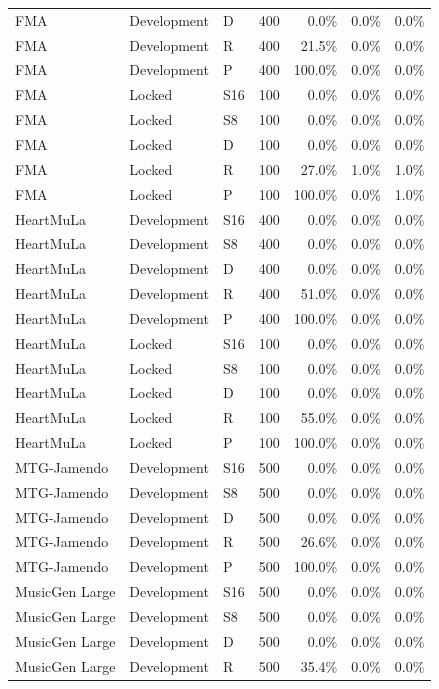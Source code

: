 \begin{longtable}{lllrrrr}
FMA & Development & D & 400 & 0.0\% & 0.0\% & 0.0\% \\
FMA & Development & R & 400 & 21.5\% & 0.0\% & 0.0\% \\
FMA & Development & P & 400 & 100.0\% & 0.0\% & 0.0\% \\
FMA & Locked & S16 & 100 & 0.0\% & 0.0\% & 0.0\% \\
FMA & Locked & S8 & 100 & 0.0\% & 0.0\% & 0.0\% \\
FMA & Locked & D & 100 & 0.0\% & 0.0\% & 0.0\% \\
FMA & Locked & R & 100 & 27.0\% & 1.0\% & 1.0\% \\
FMA & Locked & P & 100 & 100.0\% & 0.0\% & 1.0\% \\
HeartMuLa & Development & S16 & 400 & 0.0\% & 0.0\% & 0.0\% \\
HeartMuLa & Development & S8 & 400 & 0.0\% & 0.0\% & 0.0\% \\
HeartMuLa & Development & D & 400 & 0.0\% & 0.0\% & 0.0\% \\
HeartMuLa & Development & R & 400 & 51.0\% & 0.0\% & 0.0\% \\
HeartMuLa & Development & P & 400 & 100.0\% & 0.0\% & 0.0\% \\
HeartMuLa & Locked & S16 & 100 & 0.0\% & 0.0\% & 0.0\% \\
HeartMuLa & Locked & S8 & 100 & 0.0\% & 0.0\% & 0.0\% \\
HeartMuLa & Locked & D & 100 & 0.0\% & 0.0\% & 0.0\% \\
HeartMuLa & Locked & R & 100 & 55.0\% & 0.0\% & 0.0\% \\
HeartMuLa & Locked & P & 100 & 100.0\% & 0.0\% & 0.0\% \\
MTG-Jamendo & Development & S16 & 500 & 0.0\% & 0.0\% & 0.0\% \\
MTG-Jamendo & Development & S8 & 500 & 0.0\% & 0.0\% & 0.0\% \\
MTG-Jamendo & Development & D & 500 & 0.0\% & 0.0\% & 0.0\% \\
MTG-Jamendo & Development & R & 500 & 26.6\% & 0.0\% & 0.0\% \\
MTG-Jamendo & Development & P & 500 & 100.0\% & 0.0\% & 0.0\% \\
MusicGen Large & Development & S16 & 500 & 0.0\% & 0.0\% & 0.0\% \\
MusicGen Large & Development & S8 & 500 & 0.0\% & 0.0\% & 0.0\% \\
MusicGen Large & Development & D & 500 & 0.0\% & 0.0\% & 0.0\% \\
MusicGen Large & Development & R & 500 & 35.4\% & 0.0\% & 0.0\% \\

\end{longtable}
